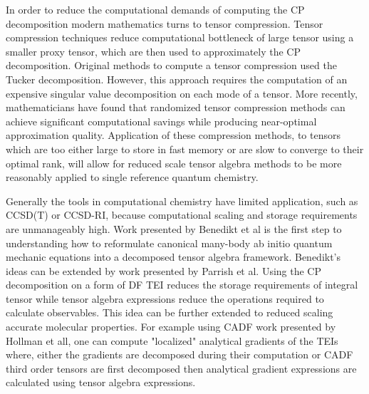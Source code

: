	In order to reduce the computational demands of computing the CP decomposition modern mathematics turns to tensor compression.  Tensor compression techniques reduce computational bottleneck of large tensor using a smaller proxy tensor, which are then used to approximately the CP decomposition. Original methods to compute a tensor compression used the Tucker decomposition\cite{Bro1998,Lathauwer2000}. However, this approach requires the computation of an expensive singular value decomposition on each mode of a tensor. More recently, mathematicians have found that randomized tensor compression methods can achieve significant computational savings while producing near-optimal approximation quality\cite{Erichson2017}. Application of these compression methods, to tensors which are too either large to store in fast memory or are slow to converge to their optimal rank, will allow for reduced scale tensor algebra methods to be more reasonably applied to single reference quantum chemistry.

	Generally the tools in computational chemistry have limited application, such as CCSD(T) or CCSD-RI, because computational scaling and storage  requirements are unmanageably high.  Work presented by Benedikt et al\cite{Benedikt2011,Benedikt2013,Benedikt2013a,Benedikt2014} is the first step to understanding how to reformulate canonical many-body ab initio quantum mechanic equations into a decomposed tensor algebra framework.  Benedikt's ideas can be extended by work presented by Parrish et al\cite{Parrish2012}.  Using the CP decomposition on a form of DF TEI reduces the storage requirements of integral tensor while tensor algebra expressions reduce the operations required to calculate observables. This idea can be further extended to reduced scaling accurate molecular properties. For example using CADF work presented by Hollman et all\cite{Hollman2014}, one can compute "localized" analytical gradients of the TEIs where, either the gradients are decomposed during their computation or CADF third order tensors are first decomposed then analytical gradient expressions are calculated using tensor algebra expressions.  

